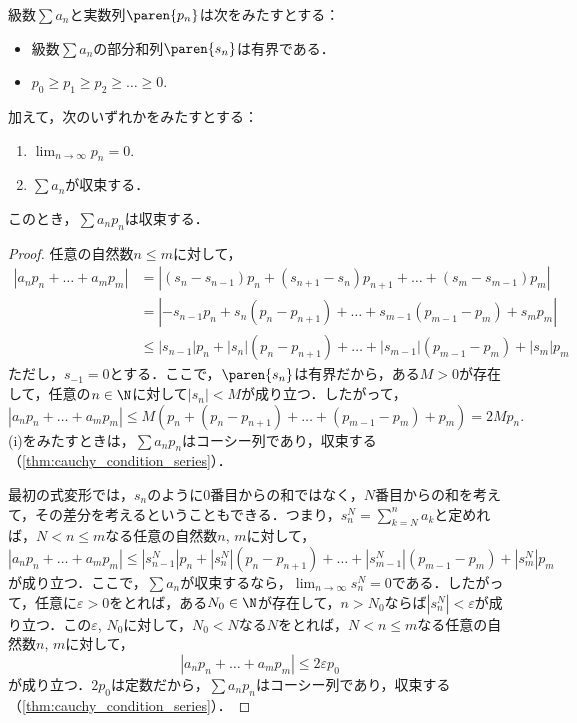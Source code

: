 \documentclass[a4paper,10pt]{ltjsarticle}
\begin{document}
\begin{MyTheorem}
  級数\(\sum a_n\)と実数列\(\paren{p_n}\)は次をみたすとする：
  \begin{itemize}
    \item 級数\(\sum a_n\)の部分和列\(\paren{s_n}\)は有界である．
    \item \(p_0 \ge p_1 \ge p_2 \ge \dots \ge 0\).
  \end{itemize}
  加えて，次のいずれかをみたすとする：
  \begin{enumerate}
    \item \(\lim_{n\to\infty} p_n = 0\).
    \item \(\sum a_n\)が収束する．
  \end{enumerate}
  このとき，\(\sum a_n p_n\)は収束する．
\end{MyTheorem}
\begin{proof}
  任意の自然数\(n \le m\)に対して，
  \begin{align*}
    |a_np_n + \dots + a_mp_m| & = |(s_{n} - s_{n-1})p_n + (s_{n+1} - s_n)p_{n+1} + \dots + (s_m - s_{m-1})p_m|        \\
                              & = |-s_{n-1}p_n + s_n(p_n - p_{n+1}) + \dots + s_{m-1}(p_{m-1} - p_m) + s_mp_m|        \\
                              & \le |s_{n-1}|p_n + |s_n|(p_n - p_{n+1}) + \dots + |s_{m-1}|(p_{m-1} - p_m) + |s_m|p_m
  \end{align*}
  ただし，\(s_{-1} = 0\)とする．ここで，\(\paren{s_n}\)は有界だから，ある\(M > 0\)が存在して，任意の\(n \in \N\)に対して\(|s_n| < M\)が成り立つ．したがって，
  \[ |a_np_n + \dots + a_mp_m| \le M(p_n + (p_n - p_{n+1}) + \dots + (p_{m-1} - p_m) + p_m) = 2Mp_n. \]
  (i)をみたすときは，\(\sum a_n p_n\)はコーシー列であり，収束する（\cref{thm:cauchy_condition_series}）．

  最初の式変形では，\(s_n\)のように\(0\)番目からの和ではなく，\(N\)番目からの和を考えて，その差分を考えるということもできる．つまり，\(s^N_n = \sum_{k=N}^n a_k\)と定めれば，\(N < n \le m\)なる任意の自然数\(n\), \(m\)に対して，
  \[ |a_np_n + \dots + a_mp_m| \le |s^N_{n-1}|p_n + |s^N_n|(p_n - p_{n+1}) + \dots + |s^N_{m-1}|(p_{m-1} - p_m) + |s^N_m|p_m \]
  が成り立つ．ここで，\(\sum a_n\)が収束するなら，\(\lim_{n\to\infty} s^N_n = 0\)である．したがって，任意に\(\varepsilon > 0\)をとれば，ある\(N_0 \in \N\)が存在して，\(n > N_0\)ならば\(|s^N_n| < \varepsilon\)が成り立つ．この\(\varepsilon\), \(N_0\)に対して，\(N_0 < N\)なる\(N\)をとれば，\(N < n \le m\)なる任意の自然数\(n\), \(m\)に対して，
  \[ |a_np_n + \dots + a_mp_m| \le 2\varepsilon p_0 \]
  が成り立つ．\(2p_0\)は定数だから，\(\sum a_n p_n\)はコーシー列であり，収束する（\cref{thm:cauchy_condition_series}）．
\end{proof}
\end{document}
